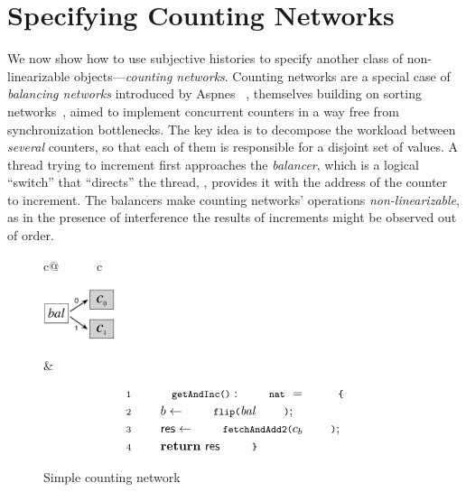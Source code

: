 \section{Specifying Counting Networks}
\label{sec:counting}

We now show how to use subjective histories to specify another class
of non-linearizable objects---\emph{counting networks}.
%
Counting networks are a special case of \emph{balancing networks}
introduced by Aspnes \etal~\cite{Aspnes-al:JACM94}, themselves
building on sorting networks~\cite{Ajtai-al:STOC83}, aimed to
implement concurrent counters in a way free from synchronization
bottlenecks.
%
The key idea is to decompose the workload between \emph{several}
counters, so that each of them is responsible for a disjoint set of
values. A thread trying to increment first approaches the
\emph{balancer}, which is a logical ``switch'' that ``directs'' the
thread, \ie, provides it with the address of the counter to increment.
%
The balancers make counting networks' operations
\emph{non-linearizable}, as in the presence of interference the
results of increments might be observed out of order.
%
{
\begin{figure}%
\begin{tabular}{c@{\ \ \ \ \ \ }c}
\begin{minipage}[c]{2.5cm}
\includegraphics[width=2.1cm]{counter.pdf} 
\end{minipage}
&
\begin{minipage}[l]{4.9cm}
\centering
{\small{
\[
\begin{array}{rl}
\Num{1} & \esc{getAndInc()} : \esc{nat}~=~\esc{\{}  \\[2pt] 
\Num{2} & ~~~~ b \Asgn \esc{flip(}\bal\esc{)};\\[2pt]
\Num{3} & ~~~~ \res \Asgn \esc{fetchAndAdd2(}c_b\esc{)};\\[2pt]
\Num{4} & ~~~~ \kw{return}~\res~\esc{\}}
\end{array}
\]
}}
\end{minipage} 
%
\end{tabular}
%
\vspace{-10pt}  
\caption{Simple counting network}
\label{fig:counter-fig} 
\end{figure}
}

